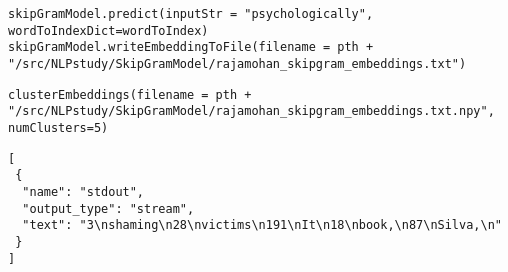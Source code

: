 \documentclass[
]{article}
\begin{document}
\begin{verbatim}
skipGramModel.predict(inputStr = "psychologically", wordToIndexDict=wordToIndex)
skipGramModel.writeEmbeddingToFile(filename = pth + "/src/NLPstudy/SkipGramModel/rajamohan_skipgram_embeddings.txt")
\end{verbatim}

\begin{verbatim}
clusterEmbeddings(filename = pth + "/src/NLPstudy/SkipGramModel/rajamohan_skipgram_embeddings.txt.npy", numClusters=5)
\end{verbatim}

\begin{verbatim}
[
 {
  "name": "stdout",
  "output_type": "stream",
  "text": "3\nshaming\n28\nvictims\n191\nIt\n18\nbook,\n87\nSilva,\n"
 }
]
\end{verbatim}

\begin{verbatim}

\end{verbatim}
\end{document}
